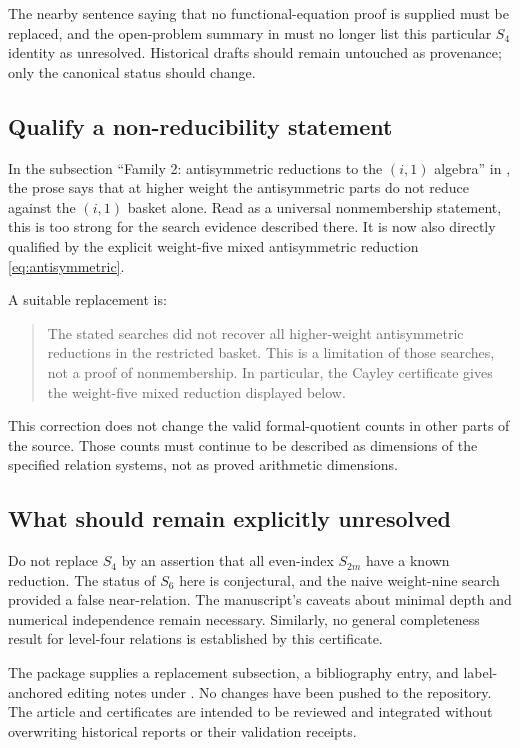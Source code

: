 \documentclass[11pt,letterpaper]{article}
\numberwithin{equation}{section}
\theoremstyle{definition}
\begin{document}
The nearby sentence saying that no functional-equation proof is supplied
must be replaced, and the open-problem summary in
 must no longer list this particular
$S_4$ identity as unresolved. Historical drafts should remain untouched
as provenance; only the canonical status should change.

\subsection{Qualify a non-reducibility statement}
In the subsection ``Family 2: antisymmetric reductions to the $(i,1)$
algebra'' in , the prose says that at higher
weight the antisymmetric parts do not reduce against the $(i,1)$ basket
alone. Read as a universal nonmembership statement, this is too strong
for the search evidence described there. It is now also directly
qualified by the explicit weight-five mixed antisymmetric reduction
\eqref{eq:antisymmetric}.

A suitable replacement is:
\begin{quote}
The stated searches did not recover all higher-weight antisymmetric
reductions in the restricted basket. This is a limitation of those
searches, not a proof of nonmembership. In particular, the Cayley
certificate gives the weight-five mixed reduction displayed below.
\end{quote}
This correction does not change the valid formal-quotient counts in
other parts of the source. Those counts must continue to be described
as dimensions of the specified relation systems, not as proved
arithmetic dimensions.

\subsection{What should remain explicitly unresolved}
Do not replace $S_4$ by an assertion that all even-index $S_{2m}$ have a
known reduction. The status of $S_6$ here is conjectural, and the naive
weight-nine search provided a false near-relation. The manuscript's
caveats about minimal depth and numerical independence remain necessary.
Similarly, no general completeness result for level-four relations is
established by this certificate.

The package supplies a replacement subsection, a bibliography entry,
and label-anchored editing notes under . No changes
have been pushed to the repository. The article and certificates are
intended to be reviewed and integrated without overwriting historical
reports or their validation receipts.
\end{document}

